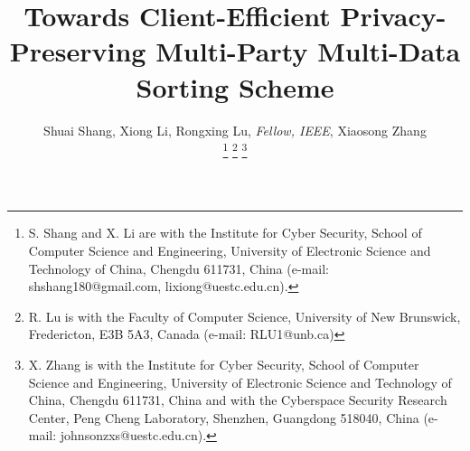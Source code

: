 \documentclass[IEEE JOURNAL OF BIOMEDICAL AND HEALTH INFORMATICS]{IEEEtran}
\begin{document}
%

\title{ Towards Client-Efficient Privacy-Preserving Multi-Party Multi-Data Sorting Scheme}
%
%
%
\author{Shuai Shang, Xiong Li, Rongxing Lu, \textit{Fellow, IEEE}, Xiaosong Zhang

\thanks{S. Shang and X. Li are with the Institute for Cyber Security, School of Computer Science and Engineering, University of Electronic Science and Technology of China, Chengdu 611731, China (e-mail:  shshang180@gmail.com, lixiong@uestc.edu.cn).}
\thanks{R. Lu is with the Faculty of Computer Science, University of New Brunswick, Fredericton, E3B 5A3, Canada (e-mail: RLU1@unb.ca)}
\thanks{X. Zhang is with the Institute for Cyber Security, School of Computer Science and Engineering, University of Electronic Science and Technology of China, Chengdu 611731, China and with the Cyberspace Security Research Center, Peng Cheng Laboratory, Shenzhen, Guangdong 518040, China (e-mail: johnsonzxs@uestc.edu.cn).}}
\end{document}

